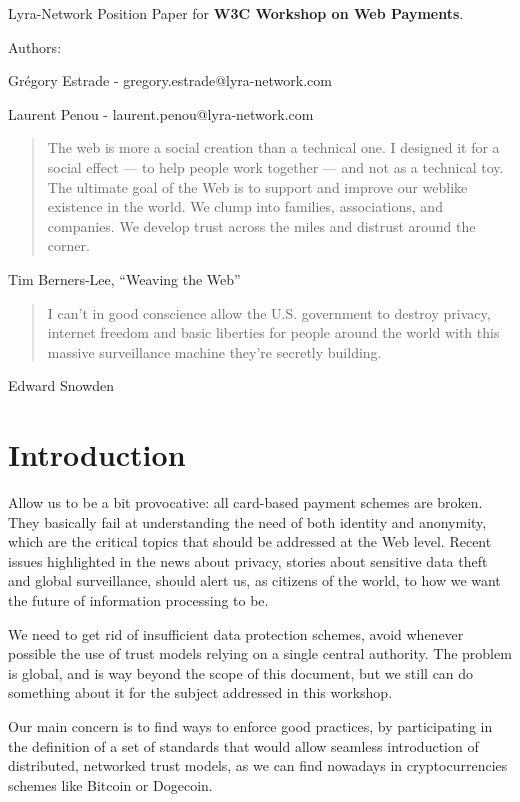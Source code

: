 Lyra-Network Position Paper for \textbf{W3C Workshop on Web Payments}.

Authors:

Grégory Estrade - gregory.estrade@lyra-network.com

Laurent Penou - laurent.penou@lyra-network.com

\begin{quote}
The web is more a social creation than a technical one. I designed it
for a social effect --- to help people work together --- and not as a
technical toy. The ultimate goal of the Web is to support and improve
our weblike existence in the world. We clump into families,
associations, and companies. We develop trust across the miles and
distrust around the corner.
\end{quote}

Tim Berners-Lee, ``Weaving the Web''

\begin{quote}
I can't in good conscience allow the U.S. government to destroy privacy,
internet freedom and basic liberties for people around the world with
this massive surveillance machine they're secretly building.
\end{quote}

Edward Snowden

\section{Introduction}\label{introduction}

Allow us to be a bit provocative: all card-based payment schemes are
broken. They basically fail at understanding the need of both identity
and anonymity, which are the critical topics that should be addressed at
the Web level. Recent issues highlighted in the news about privacy,
stories about sensitive data theft and global surveillance, should alert
us, as citizens of the world, to how we want the future of information
processing to be.

We need to get rid of insufficient data protection schemes, avoid
whenever possible the use of trust models relying on a single central
authority. The problem is global, and is way beyond the scope of this
document, but we still can do something about it for the subject
addressed in this workshop.

Our main concern is to find ways to enforce good practices, by
participating in the definition of a set of standards that would allow
seamless introduction of distributed, networked trust models, as we can
find nowadays in cryptocurrencies schemes like Bitcoin or Dogecoin.

